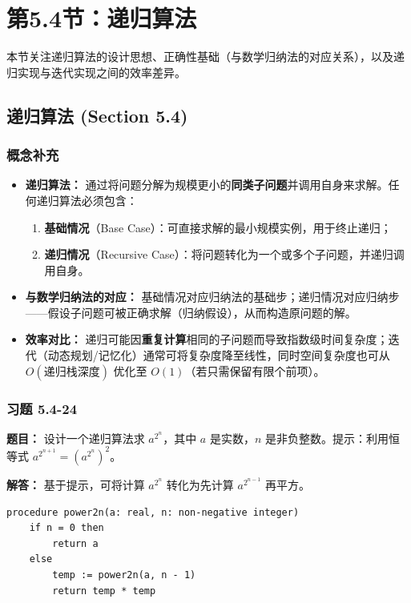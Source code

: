 \documentclass[11pt,UTF8]{article}
\begin{document}
\section{第5.4节：递归算法}

本节关注递归算法的设计思想、正确性基础（与数学归纳法的对应关系），以及递归实现与迭代实现之间的效率差异。

\subsection{递归算法 (Section 5.4)}

\subsubsection*{概念补充}
\begin{itemize}
    \item \textbf{递归算法：} 通过将问题分解为规模更小的\textbf{同类子问题}并调用自身来求解。任何递归算法必须包含：
    \begin{enumerate}[1.]
        \item \textbf{基础情况}（Base Case）：可直接求解的最小规模实例，用于终止递归；
        \item \textbf{递归情况}（Recursive Case）：将问题转化为一个或多个子问题，并递归调用自身。
    \end{enumerate}
    \item \textbf{与数学归纳法的对应：} 基础情况对应归纳法的基础步；递归情况对应归纳步——假设子问题可被正确求解（归纳假设），从而构造原问题的解。
    \item \textbf{效率对比：} 递归可能因\textbf{重复计算}相同的子问题而导致指数级时间复杂度；迭代（动态规划/记忆化）通常可将复杂度降至线性，同时空间复杂度也可从 $O(\text{递归栈深度})$ 优化至 $O(1)$（若只需保留有限个前项）。
\end{itemize}

\subsubsection*{习题 5.4-24}
\textbf{题目：} 设计一个递归算法求 $a^{2^n}$，其中 $a$ 是实数，$n$ 是非负整数。提示：利用恒等式 $a^{2^{n+1}} = (a^{2^n})^2$。

\textbf{解答：} 基于提示，可将计算 $a^{2^n}$ 转化为先计算 $a^{2^{n-1}}$ 再平方。

\begin{verbatim}
procedure power2n(a: real, n: non-negative integer)
    if n = 0 then
        return a
    else
        temp := power2n(a, n - 1)
        return temp * temp
\end{verbatim}
\end{document}
